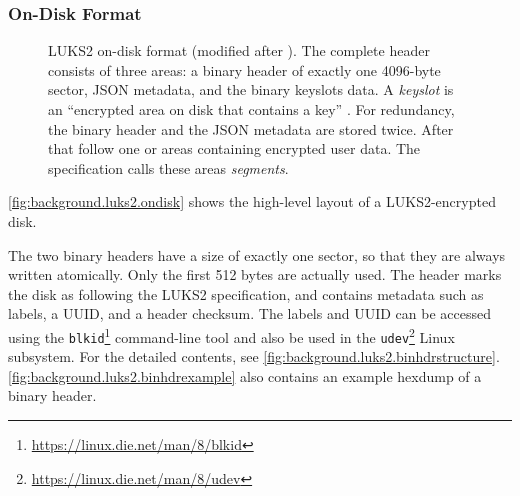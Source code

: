 \subsubsection{On-Disk Format}
\label{chap:background.luks2.ondisk}
\begin{figure}[htb!]
	\caption[
		LUKS2 on-disk format
	]{
		LUKS2 on-disk format (modified after \cite{Broz2018}). The complete header consists of three areas: a binary header of exactly one 4096-byte sector, JSON metadata, and the binary keyslots data. A \emph{keyslot} is an ``encrypted area on disk that contains a key'' \cite{Broz2018}. For redundancy, the binary header and the JSON metadata are stored twice. After that follow one or areas containing encrypted user data. The specification calls these areas \emph{segments}.
	}
	\label{fig:background.luks2.ondisk}
\end{figure}

\autoref{fig:background.luks2.ondisk} shows the high-level layout of a LUKS2-encrypted disk.

The two binary headers have a size of exactly one sector, so that they are always written atomically. Only the first 512 bytes are actually used. The header marks the disk as following the LUKS2 specification, and contains metadata such as labels, a UUID, and a header checksum. The labels and UUID can be accessed using the \texttt{blkid}\footnote{\label{fn:background.luks2.blkid} \url{https://linux.die.net/man/8/blkid}} command-line tool and also be used in the \texttt{udev}\footnote{\label{fn:background.luks2.udev} \url{https://linux.die.net/man/8/udev}} Linux subsystem. For the detailed contents, see \autoref{fig:background.luks2.binhdrstructure}. \autoref{fig:background.luks2.binhdrexample} also contains an example hexdump of a binary header.


